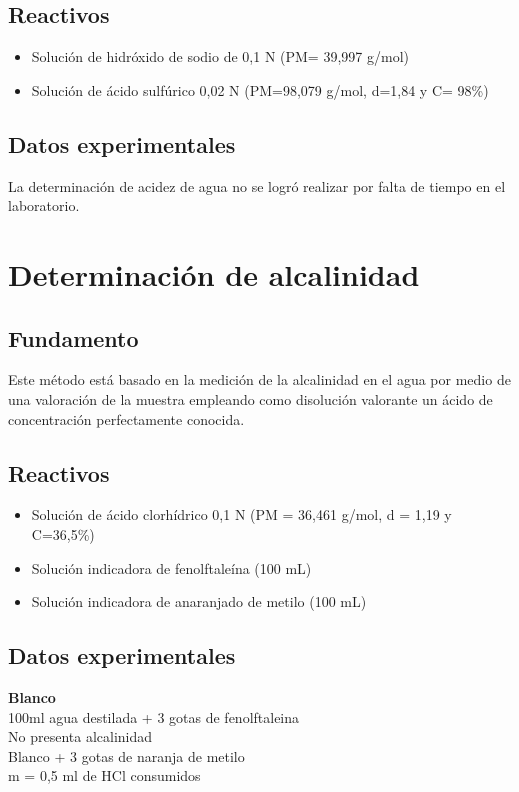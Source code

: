 \documentclass[a4paper,12pt]{article} %
\begin{document}
\subsection{Reactivos} 
\begin{itemize}
\item{Solución de hidróxido de sodio de 0,1 N (PM= 39,997 g/mol)}
\item{Solución de ácido sulfúrico 0,02 N (PM=98,079 g/mol, d=1,84 y C= 98\%)}
\end{itemize}

\subsection{Datos experimentales}
La determinación de acidez de agua no se logró realizar por falta de tiempo en el laboratorio. 



\newpage

\section{Determinación de alcalinidad}

\subsection{Fundamento} 
Este método está basado en la medición de la alcalinidad en el agua por medio de una valoración de la muestra empleando como disolución valorante un ácido de concentración perfectamente conocida.            

\subsection{Reactivos} 
\begin{itemize}
    \item{Solución de ácido clorhídrico 0,1 N (PM = 36,461 g/mol, d = 1,19 y C=36,5\%)} 
    \item{Solución indicadora de fenolftaleína (100 mL)}
    \item{Solución indicadora de anaranjado de metilo (100 mL)}
\end{itemize}

\subsection{Datos experimentales}
\textbf{Blanco} \\
100ml agua destilada + 3 gotas de fenolftaleina \\
No presenta alcalinidad \\
Blanco + 3 gotas de naranja de metilo \\
m = 0,5 ml de HCl consumidos \\
\end{document}
